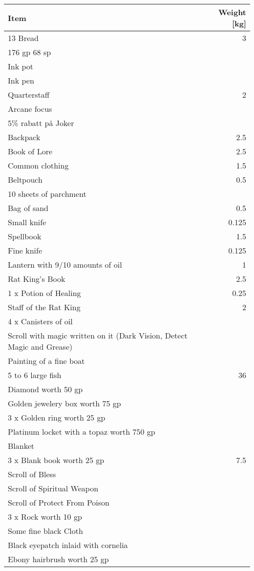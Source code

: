 \documentclass[11pt]{article}
\begin{document}
\noindent \begin{tabularx}{\textwidth}{X|r}
Item & Weight [kg] \\
\hline
13 Bread \dotfill 							& 3 	\\
176 gp 68 sp								& 		\\
Ink pot 									& 		\\
Ink pen 									& 		\\
Quarterstaff \dotfill 						& 2 	\\
Arcane focus 								& 		\\
5\% rabatt på Joker 						& 		\\
Backpack \dotfill 							& 2.5 	\\
Book of Lore \dotfill 						& 2.5 	\\
Common clothing \dotfill 					& 1.5 	\\
Beltpouch \dotfill 							& 0.5 	\\
10 sheets of parchment 						& 		\\
Bag of sand \dotfill 						& 0.5 	\\
Small knife \dotfill 						& 0.125 \\
Spellbook \dotfill 							& 1.5 	\\
Fine knife \dotfill 						& 0.125	\\
Lantern with 9/10 amounts of oil \dotfill 	& 1 	\\
Rat King's Book \dotfill 					& 2.5 	\\
1 x Potion of Healing \dotfill				& 0.25	\\
Staff of the Rat King \dotfill				& 2		\\
4 x Canisters of oil						&		\\
Scroll with magic written on it	(Dark Vision, Detect Magic and Grease)			&		\\
Painting of a fine boat						&		\\
5 to 6 large fish \dotfill					& 36	\\
Diamond worth 50 gp							&		\\
Golden jewelery box worth 75 gp				&		\\
3 x Golden ring worth 25 gp					&		\\
Platinum locket with a topaz worth 750 gp	&		\\
Blanket										&		\\
3 x Blank book worth 25 gp \dotfill			& 7.5	\\
Scroll of Bless								& 		\\
Scroll of Spiritual Weapon					&		\\
Scroll of Protect From Poison				&		\\
3 x Rock worth 10 gp						&		\\
Some fine black Cloth						&		\\
Black eyepatch inlaid with cornelia			&		\\
Ebony hairbrush worth 25 gp					&		
	\end{tabularx}
\end{document}
